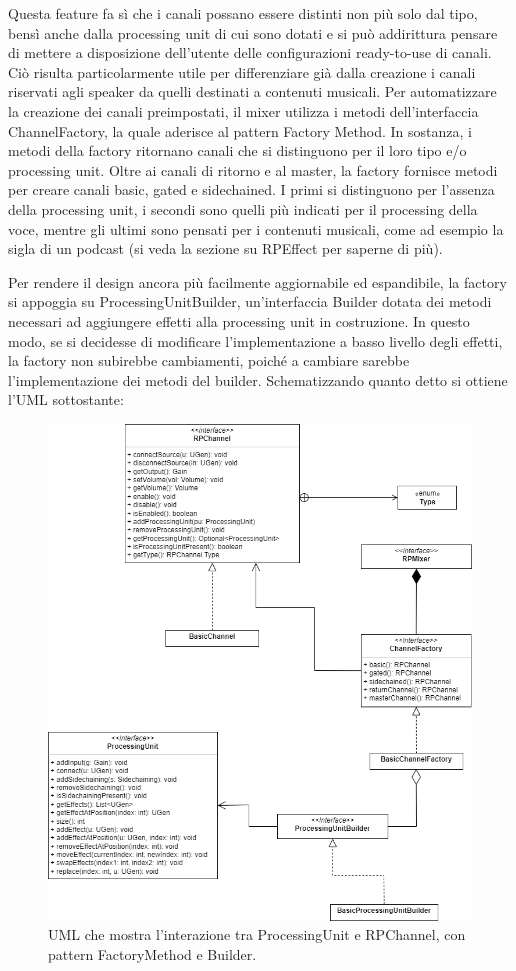 \documentclass[a4paper,12pt]{report}
\begin{document}
Questa feature fa sì che i canali possano essere distinti non più solo dal tipo, bensì anche dalla processing unit di cui sono dotati e si può addirittura pensare di mettere a disposizione dell’utente delle configurazioni ready-to-use di canali. Ciò risulta particolarmente utile per differenziare già dalla creazione i canali riservati agli speaker da quelli destinati a contenuti musicali.
Per automatizzare la creazione dei canali preimpostati, il mixer utilizza i metodi dell’interfaccia ChannelFactory, la quale aderisce al pattern Factory Method. In sostanza, i metodi della factory ritornano canali che si distinguono per il loro tipo e/o processing unit. Oltre ai canali di ritorno e al master, la factory fornisce metodi per creare canali basic, gated e sidechained. I primi si distinguono per l’assenza della processing unit, i secondi sono quelli più indicati per il processing della voce, mentre gli ultimi sono pensati per i contenuti musicali, come ad esempio la sigla di un podcast (si veda la sezione su RPEffect per saperne di più).

Per rendere il design ancora più facilmente aggiornabile ed espandibile, la factory si appoggia su ProcessingUnitBuilder, un’interfaccia Builder dotata dei metodi necessari ad aggiungere effetti alla processing unit in costruzione. In questo modo, se si decidesse di modificare l’implementazione a basso livello degli effetti, la factory non subirebbe cambiamenti, poiché a cambiare sarebbe l’implementazione dei metodi del builder.
Schematizzando quanto detto si ottiene l’UML sottostante:

\begin{figure}[H]
\centering{}
\includegraphics[width=\textwidth]{img/processingUnit.png}
\caption{UML che mostra l'interazione tra ProcessingUnit e RPChannel, con pattern FactoryMethod e Builder.}
\end{figure}
\end{document}
